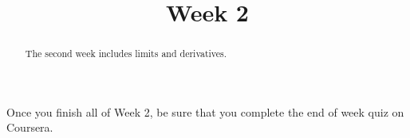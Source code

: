 \documentclass{ximera}
\title{Week 2}
\begin{document}
\begin{abstract}
  The second week includes limits and derivatives.
\end{abstract}

Once you finish all of Week 2, be sure that you complete the end of
week quiz on Coursera.
\end{document}
